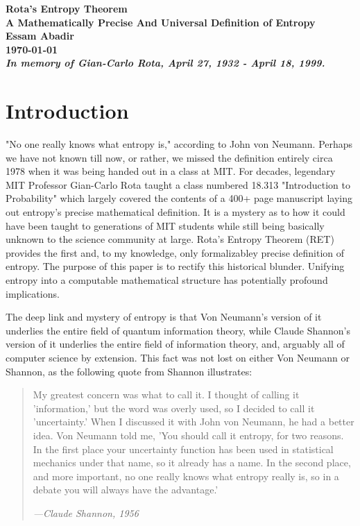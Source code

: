 \documentclass{report}
\begin{document}
\begin{titlepage}
    \centering
    \vspace*{\fill}
    \Huge\bfseries Rota's Entropy Theorem\\
    \Large A Mathematically Precise And Universal Definition of Entropy\\
    \vspace{1cm}
    \Large Essam Abadir\\
    \vspace{1cm}
    \large \today\\

    \vspace{3cm}
    \normalfont \emph{In memory of Gian-Carlo Rota, April 27, 1932 - April 18, 1999.}
    \vspace*{\fill}
\end{titlepage}
\section*{Introduction}
"No one really knows what entropy is," according to John von Neumann. Perhaps we have not known till now, or rather, we missed the definition entirely circa 1978 when it was being handed out in a class at MIT. For decades, legendary MIT Professor Gian-Carlo Rota taught a class numbered 18.313 "Introduction to Probability" which largely covered the contents of a 400+ page manuscript laying out entropy's precise mathematical definition. It is a mystery as to how it could have been taught to generations of MIT students while still being basically unknown to the science community at large. Rota's Entropy Theorem (RET) provides the first and, to my knowledge, only formalizabley precise definition of entropy. The purpose of this paper is to rectify this historical blunder. Unifying entropy into a computable mathematical structure has potentially profound implications. 

The deep link and mystery of entropy is that Von Neumann's version of it underlies the entire field of quantum information theory, while Claude Shannon's version of it underlies the entire field of information theory, and, arguably all of computer science by extension. This fact was not lost on either Von Neumann or Shannon, as the following quote from Shannon illustrates:

\begin{quotation}
  My greatest concern was what to call it. I thought of calling it 'information,' but the word was overly used, so I decided to call it 'uncertainty.' When I discussed it with John von Neumann, he had a better idea. Von Neumann told me, 'You should call it entropy, for two reasons. In the first place your uncertainty function has been used in statistical mechanics under that name, so it already has a name. In the second place, and more important, no one really knows what entropy really is, so in a debate you will always have the advantage.'  
  \medskip

  \emph{—Claude Shannon, 1956}
\end{quotation} 
\end{document}
